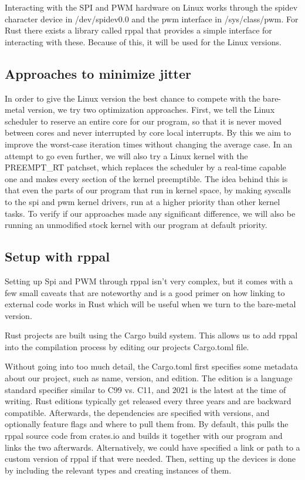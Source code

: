 Interacting with the SPI and PWM hardware on Linux works through the spidev character device in /dev/spidev0.0 and the pwm interface in /sys/class/pwm.
For Rust there exists a library called rppal that provides a simple interface for interacting with these.
Because of this, it will be used for the Linux versions.

\subsection{Approaches to minimize jitter}
\label{sec:concept_and_implementation:linux:approaches}

In order to give the Linux version the best chance to compete with the bare-metal version, we try two optimization approaches.
First, we tell the Linux scheduler to reserve an entire core for our program, so that it is never moved between cores and never interrupted by core local interrupts.
By this we aim to improve the worst-case iteration times without changing the average case.
In an attempt to go even further, we will also try a Linux kernel with the PREEMPT\_RT patchset,
which replaces the scheduler by a real-time capable one and makes every section of the kernel preemptible.
The idea behind this is that even the parts of our program that run in kernel space,
by making syscalls to the spi and pwm kernel drivers, run at a higher priority than other kernel tasks.
To verify if our approaches made any significant difference, we will also be running an unmodified stock kernel with our program at default priority.

\subsection{Setup with rppal}
\label{sec:concept_and_implementation:linux:rppal}

Setting up Spi and PWM through rppal isn't very complex,
but it comes with a few small caveats that are noteworthy
and is a good primer on how linking to external code works in Rust which will be useful when we turn to the bare-metal version.

Rust projects are built using the Cargo build system. This allows us to add rppal into the compilation process by editing our projects Cargo.toml file.



Without going into too much detail, the Cargo.toml first specifies some metadata about our project, such as name, version, and edition.
The edition is a language standard specifier similar to C99 vs. C11, and 2021 is the latest at the time of writing.
Rust editions typically get released every three years and are backward compatible.
Afterwards, the dependencies are specified with versions, and optionally feature flags and where to pull them from.
By default, this pulls the rppal source code from crates.io and builds it together with our program and links the two afterwards.
Alternatively, we could have specified a link or path to a custom version of rppal if that were needed.
Then, setting up the devices is done by including the relevant types and creating instances of them.

